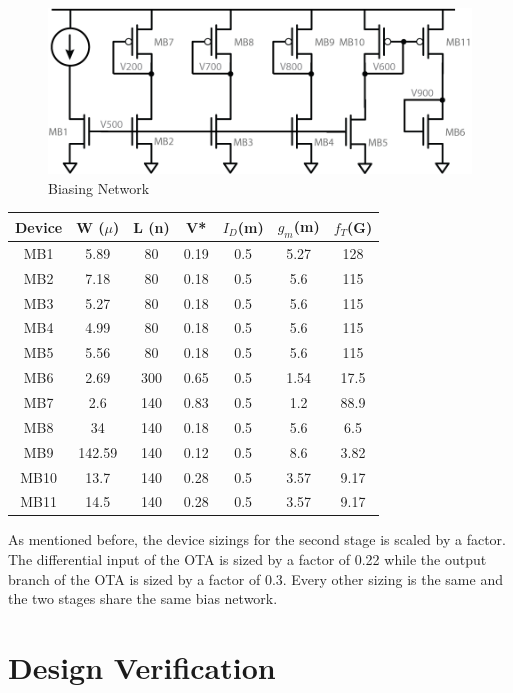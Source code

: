 \documentclass[conference]{IEEEtran}
\begin{document}
\begin{figure}[h]
\centering
\includegraphics[width=0.75\linewidth]{illus/bias}
\caption{Biasing Network}
\label{fig:bias}
\end{figure}

\begin{center}
\begin{tabular}{|c|c|c|c|c|c|c|} 
\hline
Device & W ($\mu$) & L (n) & V* & $I_D$(m) & $g_m$(m) & $f_T$(G) \\
\hline
MB1 & 5.89 & 80 & 0.19 & 0.5 & 5.27 & 128 \\
\hline
MB2 & 7.18 & 80 & 0.18 & 0.5 & 5.6 & 115 \\
\hline
MB3 & 5.27 & 80 & 0.18 & 0.5 & 5.6 & 115\\
\hline
MB4 & 4.99 & 80 & 0.18 & 0.5 & 5.6 & 115\\
\hline
MB5 & 5.56 & 80 & 0.18 & 0.5 & 5.6 & 115\\
\hline
MB6 & 2.69 & 300 & 0.65 & 0.5 & 1.54 & 17.5 \\
\hline
MB7 & 2.6 & 140 & 0.83 & 0.5 & 1.2 & 88.9 \\
\hline
MB8 & 34 & 140 & 0.18 & 0.5 & 5.6 & 6.5 \\
\hline
MB9 & 142.59 & 140 & 0.12 & 0.5 & 8.6 & 3.82 \\
\hline
MB10 & 13.7 & 140 & 0.28 & 0.5 & 3.57 & 9.17 \\
\hline
MB11 & 14.5 & 140 & 0.28 & 0.5 & 3.57 & 9.17 \\
\hline
\end{tabular}
\end{center}


As mentioned before, the device sizings for the second stage is scaled by a factor. The differential input of the OTA is sized by a factor of 0.22 while the output branch of the OTA is sized by a factor of 0.3. Every other sizing is the same and the two stages share the same bias network.


\section{Design Verification}
\end{document}
